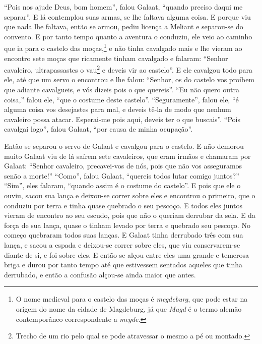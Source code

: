 “Pois nos ajude Deus, bom homem”, falou Galaat, “quando preciso daqui me
separar”. E lá contemplou suas armas, se lhe faltava alguma coisa. E porque viu
que nada lhe faltava, então se armou, pediu licença a Meliant e separou-se do
convento. E por tanto tempo quanto a aventura o conduziu, ele veio ao caminho
que ia para o castelo das moças,\footnote{ O nome medieval para o castelo das
moças é \textit{megdeburg}, que pode estar na origem do nome da cidade de
Magdeburg, já que \textit{Magd} é o termo alemão contemporâneo
correspondente a \textit{megde}. } e não tinha cavalgado mais e lhe vieram
ao encontro sete moças que ricamente tinham cavalgado e falaram: “Senhor
cavaleiro, ultrapassastes o vau\footnote{ Trecho de um rio pelo qual se pode
atravessar o mesmo a pé ou montado.}  e deveis vir ao castelo''. E
ele cavalgou todo para ele, até que um servo o encontrou e lhe falou: “Senhor,
os do castelo vos proíbem que adiante cavalgueis, e vós dizeis pois o que
quereis”. “Eu não quero outra coisa,'' falou ele, “que o costume deste
castelo”. “Seguramente”, falou ele, “é alguma coisa vos desejastes para mal, e
deveis tê-la de modo que nenhum cavaleiro possa atacar. Esperai-me pois aqui,
deveis ter o que buscais”. “Pois cavalgai logo”, falou Galaat, “por causa de
minha ocupação”.

Então se separou o servo de Galaat e cavalgou para o castelo. E não demorou
muito Galaat viu de lá saírem sete cavaleiros, que eram irmãos e chamaram por
Galaat: “Senhor cavaleiro, precavei-vos de nós, pois que não vos asseguramos
senão a morte!” “Como”, falou Galaat, “quereis todos lutar comigo juntos?”
“Sim”, eles falaram, “quando assim é o costume do castelo”. E pois que ele o
ouviu, sacou sua lança e deixou-se correr sobre eles e encontrou o primeiro,
que o conduziu por terra e tinha quase quebrado o seu pescoço. E todos eles
juntos vieram de encontro ao seu escudo, pois que não o queriam derrubar da
sela. E da força de sua lança, quase o tinham levado por terra e quebrado seu
pescoço. No começo quebraram todos suas lanças. E Galaat tinha derrubado três
com sua lança, e sacou a espada e deixou-se correr sobre eles, que viu
conservarem-se diante de si, e foi sobre eles. E então se alçou entre eles uma
grande e temerosa briga e durou por tanto tempo até que estivessem sentados
aqueles que tinha derrubado, e então a confusão alçou-se ainda maior que antes.


